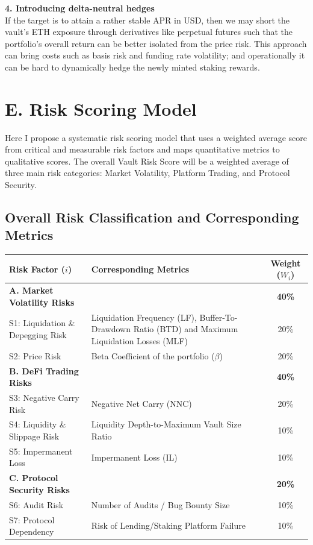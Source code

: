 \documentclass[11pt, a4paper]{article}
\begin{document}
\textbf{4. Introducing delta-neutral hedges} \\
If the target is to attain a rather stable APR in USD, then we may short the vault's ETH exposure through derivatives like perpetual futures such that the portfolio's overall return can be better isolated from the price risk. This approach can bring costs such as basis risk and funding rate volatility; and operationally it can be hard to dynamically hedge the newly minted staking rewards.

\section*{E. Risk Scoring Model}
Here I propose a systematic risk scoring model that uses a weighted average score from critical and measurable risk factors and maps quantitative metrics to qualitative scores. The overall Vault Risk Score will be a weighted average of three main risk categories: Market Volatility, Platform Trading, and Protocol Security.

\subsection*{Overall Risk Classification and Corresponding Metrics}
\begin{tabularx}{\textwidth}{@{} X X c @{}}
\toprule
\textbf{Risk Factor ($i$)} & \textbf{Corresponding Metrics} & \textbf{Weight ($W_i$)} \\
\midrule
\textbf{A. Market Volatility Risks} & & \textbf{40\%} \\
S1: Liquidation \& Depegging Risk & Liquidation Frequency (LF), Buffer-To-Drawdown Ratio (BTD) and Maximum Liquidation Losses (MLF) & 20\% \\
S2: Price Risk & Beta Coefficient of the portfolio ($\beta$) & 20\% \\
\midrule
\textbf{B. DeFi Trading Risks} & & \textbf{40\%} \\
S3: Negative Carry Risk & Negative Net Carry (NNC) & 20\% \\
S4: Liquidity \& Slippage Risk & Liquidity Depth-to-Maximum Vault Size Ratio & 10\% \\
S5: Impermanent Loss & Impermanent Loss (IL) & 10\% \\
\midrule
\textbf{C. Protocol Security Risks} & & \textbf{20\%} \\
S6: Audit Risk & Number of Audits / Bug Bounty Size & 10\% \\
S7: Protocol Dependency & Risk of Lending/Staking Platform Failure & 10\% \\
\bottomrule
\end{tabularx}
\end{document}
